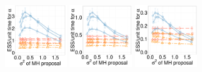   \begin{figure}[H]
  \centering
  \begin{minipage}[h!]{0.99\linewidth}
    \includegraphics [width=0.24\textwidth, angle=0]{figs/new_whole_exp_figs/cq_alpha_dim3.pdf}
	\hspace{.6in}
    \includegraphics [width=0.24\textwidth, angle=0]{figs/new_whole_exp_figs/cq_alpha_dim5.pdf}
	\hspace{.6in}
    \includegraphics [width=0.24\textwidth, angle=0]{figs/new_whole_exp_figs/cq_alpha_dim10.pdf}
  \end{minipage}


\end{figure}
